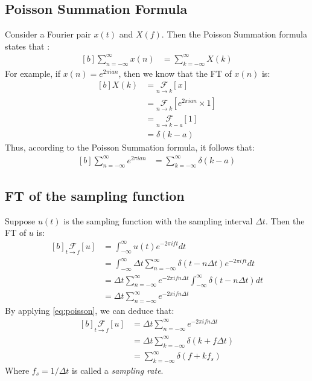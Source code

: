 \documentclass[letterpaper, 11pt]{article}
\newcommand{\fint}{\int_{-\infty}^{\infty}} %
\newcommand{\fsum}[1]{\sum_{#1 = -\infty}^{\infty}} %
\newcommand{\spf}[2]{\Delta #1 \fsum{#2} \delta (#1 - #2 \Delta #1)} %
\newcommand{\fourier}[3]{\underset{#1 \rightarrow #3}{\mathcal{F}}[#2]} %
\newcommand{\ft}[3]{\fint #2 e^{-2\pi i#3#1} d#1} %
\numberwithin{equation}{section}
\numberwithin{figure}{section}
\numberwithin{table}{section}
\begin{document}
\subsection{Poisson Summation Formula}
Consider a Fourier pair \(x(t)\) and \(X(f)\). Then the Poisson Summation formula states that \cite{stein}:
\begin{equation}
	\begin{aligned}[b]
		\fsum{n} x(n)	&= \fsum{k} X(k)
	\end{aligned}
\end{equation}
For example, if \(x(n) = e^{2 \pi ian}\), then we know that the FT of \(x(n)\) is:
\begin{equation}
	\begin{aligned}[b]
		X(k)	&= \fourier{n}{x}{k} \\
			&= \fourier{n}{e^{2 \pi ian} \times 1}{k} \\
			&= \fourier{n}{1}{k - a} \\
			&= \delta (k - a)
	\end{aligned}
\end{equation}
Thus, according to the Poisson Summation formula, it follows that:
\begin{equation}
	\begin{aligned}[b]
		\fsum{n} e^{2 \pi ian}
			&= \fsum{k} \delta (k - a)
			\label{eq:poisson}
	\end{aligned}
\end{equation}

\subsection{FT of the sampling function}
Suppose \(u(t)\) is the sampling function with the sampling interval \(\Delta t\). Then the FT of \(u\) is:
\begin{equation}
	\begin{aligned}[b]
		\fourier{t}{u}{f}
			&= \ft{t}{u(t)}{f} \\
			&= \ft{t}{\spf{t}{n}}{f} \\
			&= \Delta t \fsum{n} e^{-2\pi ifn\Delta t} \fint \delta (t - n \Delta t) dt \\
			&= \Delta t \fsum{n} e^{-2\pi ifn\Delta t}
	\end{aligned}
\end{equation}
By applying \eqref{eq:poisson}, we can deduce that:
\begin{equation}
	\begin{aligned}[b]
		\fourier{t}{u}{f}
			&= \Delta t \fsum{n} e^{-2\pi ifn\Delta t} \\
			&= \Delta t \fsum{k} \delta (k + f \Delta t)\\
			&= \fsum{k} \delta (f + kf_{s})
	\end{aligned}
\end{equation}
Where \(f_{s} = 1/\Delta t\) is called a \emph{sampling rate}.
\end{document}
